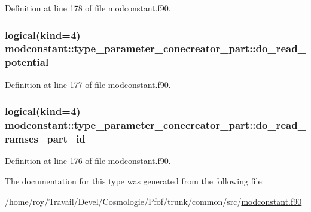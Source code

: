 Definition at line 178 of file modconstant.\+f90.

\subsubsection[{\texorpdfstring{do\+\_\+read\+\_\+potential}{do_read_potential}}]{\setlength{\rightskip}{0pt plus 5cm}logical(kind=4) modconstant\+::type\+\_\+parameter\+\_\+conecreator\+\_\+part\+::do\+\_\+read\+\_\+potential}\hypertarget{structmodconstant_1_1type__parameter__conecreator__part_ad8db85990febd9c00c5a5a6a2f1d0fd7}{}\label{structmodconstant_1_1type__parameter__conecreator__part_ad8db85990febd9c00c5a5a6a2f1d0fd7}


Definition at line 177 of file modconstant.\+f90.

\subsubsection[{\texorpdfstring{do\+\_\+read\+\_\+ramses\+\_\+part\+\_\+id}{do_read_ramses_part_id}}]{\setlength{\rightskip}{0pt plus 5cm}logical(kind=4) modconstant\+::type\+\_\+parameter\+\_\+conecreator\+\_\+part\+::do\+\_\+read\+\_\+ramses\+\_\+part\+\_\+id}\hypertarget{structmodconstant_1_1type__parameter__conecreator__part_a767cd774e985d3ce50b3131eb7ffa50b}{}\label{structmodconstant_1_1type__parameter__conecreator__part_a767cd774e985d3ce50b3131eb7ffa50b}


Definition at line 176 of file modconstant.\+f90.



The documentation for this type was generated from the following file\+:\begin{DoxyCompactItemize}
\item 
/home/roy/\+Travail/\+Devel/\+Cosmologie/\+Pfof/trunk/common/src/\hyperlink{modconstant_8f90}{modconstant.\+f90}\end{DoxyCompactItemize}
